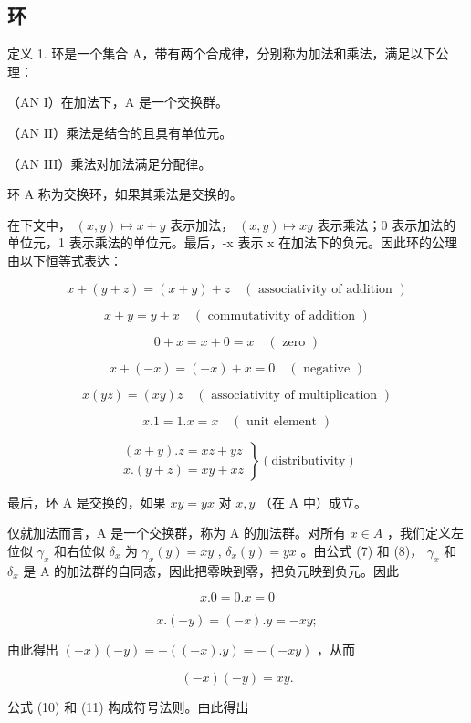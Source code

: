 \subsection{环}

定义 1. 环是一个集合 A，带有两个合成律，分别称为加法和乘法，满足以下公理：

（AN I）在加法下，A 是一个交换群。

（AN II）乘法是结合的且具有单位元。

（AN III）乘法对加法满足分配律。

环 A 称为交换环，如果其乘法是交换的。

在下文中， \((x,y)\mapsto x+y\) 表示加法， \((x,y)\mapsto xy\) 表示乘法；0 表示加法的单位元，1 表示乘法的单位元。最后，-x 表示 x 在加法下的负元。因此环的公理由以下恒等式表达：

\[
x + (y + z) = (x + y) + z \quad (\text { associativity   of   addition })\tag{1}
\]

\[
x + y = y + x \quad (\text { commutativity   of   addition })\tag{2}
\]

\[
0 + x = x + 0 = x \quad (\text { zero })\tag{3}
\]

\[
x + (- x) = (- x) + x = 0 \quad (\text { negative })\tag{4}
\]

\[
x (y z) = (x y) z \quad (\text { associativity   of   multiplication })\tag{5}
\]

\[
x. 1 = 1. x = x \quad (\text { unit   element })\tag{6}
\]

\[
\left. \begin{array}{l} (x + y). z = x z + y z \\ x. (y + z) = x y + x z \end{array} \right\} (\text {distributivity})\tag{7, 8}
\]

最后，环 A 是交换的，如果 \(xy = yx\) 对 \(x, y\) （在 A 中）成立。

仅就加法而言，A 是一个交换群，称为 A 的加法群。对所有 \(x \in A\) ，我们定义左位似 \(\gamma_{x}\) 和右位似 \(\delta_{x}\) 为 \(\gamma_{x}(y) = xy\) , \(\delta_{x}(y) = yx\) 。由公式 (7) 和 (8)， \(\gamma_{x}\) 和 \(\delta_{x}\) 是 A 的加法群的自同态，因此把零映到零，把负元映到负元。因此

\[
x. 0 = 0. x = 0\tag{9}
\]

\[
x. (- y) = (- x). y = - x y;\tag{10}
\]

由此得出 \((-x)(-y) = -((-x).y) = -(-xy)\) ，从而

\[
(- x) (- y) = x y.\tag{11}
\]

公式 (10) 和 (11) 构成符号法则。由此得出

